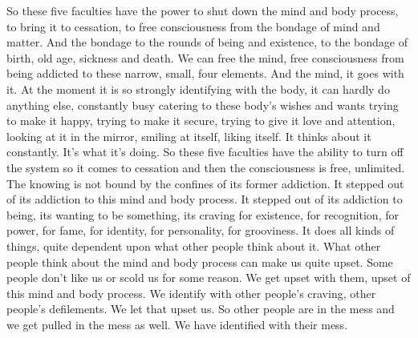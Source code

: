 \documentclass[letterpaper,10pt,english]{sphinxmanual}
\begin{document}
\sphinxAtStartPar
So these five faculties have the power to shut down the mind and body
process, to bring it to cessation, to free consciousness from the bondage of
mind and matter. And the bondage to the rounds of being and existence, to
the bondage of birth, old age, sickness and death. We can free the mind, free
consciousness  from  being  addicted  to  these  narrow,  small,  four  elements.
And the mind, it goes with it. At the moment it is so strongly identifying with
the body, it can hardly do anything else, constantly busy catering to these
body’s wishes and wants trying to make it happy, trying to make it secure,
trying  to  give  it  love  and  attention,  looking  at  it  in  the  mirror,  smiling  at
itself, liking itself. It thinks about it constantly. It’s what it’s doing. So these
five faculties have the ability to turn off the system so it comes to cessation
and then the consciousness is free, unlimited. The knowing is not bound by
the  confines  of  its  former  addiction.  It  stepped  out  of  its  addiction  to  this
mind and body process. It stepped out of its addiction to being, its wanting to
be something, its craving for existence, for recognition, for power, for fame,
for identity, for personality, for grooviness. It does all kinds of things, quite
dependent upon what other people think about it. What other people think
about  the  mind  and  body  process  can  make  us  quite  upset.  Some  people
don’t like us or scold us for some reason. We get upset with them, upset of
this mind and body process. We identify with other people’s craving, other
people’s defilements. We let that upset us. So other people are in the mess
and we get pulled in the mess as well. We have identified with their mess.
\end{document}
